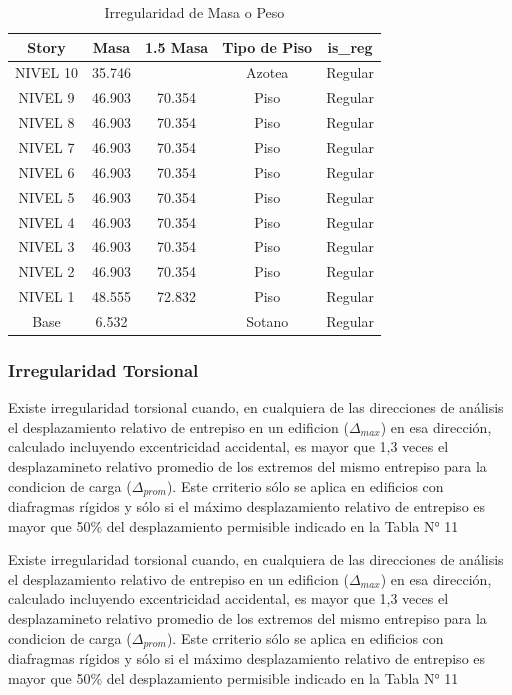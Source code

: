 \documentclass{article}%
\begin{document}
\begin{table}[H]%
\centering%
\caption{Irregularidad de Masa o Peso}%
\begin{tabular}{ccccc}
\toprule
Story & Masa & 1.5 Masa & Tipo de Piso & is\_reg \\
\midrule
NIVEL 10 & 35.746 &  & Azotea & Regular \\
NIVEL 9 & 46.903 & 70.354 & Piso & Regular \\
NIVEL 8 & 46.903 & 70.354 & Piso & Regular \\
NIVEL 7 & 46.903 & 70.354 & Piso & Regular \\
NIVEL 6 & 46.903 & 70.354 & Piso & Regular \\
NIVEL 5 & 46.903 & 70.354 & Piso & Regular \\
NIVEL 4 & 46.903 & 70.354 & Piso & Regular \\
NIVEL 3 & 46.903 & 70.354 & Piso & Regular \\
NIVEL 2 & 46.903 & 70.354 & Piso & Regular \\
NIVEL 1 & 48.555 & 72.832 & Piso & Regular \\
Base & 6.532 &  & Sotano & Regular \\
\bottomrule
\end{tabular}
%
\end{table}

%
\subsubsection{Irregularidad Torsional}%
\label{ssubsec:IrregularidadTorsional}%
\begin{tcolorbox}[colback=gray!5!white,colframe=cyan!75!black,fonttitle=\bfseries,title=Tabla N°9 E-030]%
Existe irregularidad torsional cuando, en cualquiera de las direcciones de análisis el desplazamiento relativo de entrepiso en un edificion ($\Delta_{max}$) en esa dirección, calculado incluyendo excentricidad accidental, es mayor que 1,3 veces el desplazamineto relativo promedio de los extremos del mismo entrepiso para la condicion de carga ($\Delta_{prom}$). 
 Este crriterio sólo se aplica en edificios con diafragmas rígidos y sólo si el máximo desplazamiento relativo de entrepiso es mayor que 50\% del desplazamiento permisible indicado en la Tabla N° 11%
\end{tcolorbox}%
\begin{tcolorbox}[colback=gray!5!white,colframe=cyan!75!black,fonttitle=\bfseries,title=Tabla N°9 E-030]%
Existe irregularidad torsional cuando, en cualquiera de las direcciones de análisis el desplazamiento relativo de entrepiso en un edificion ($\Delta_{max}$) en esa dirección, calculado incluyendo excentricidad accidental, es mayor que 1,3 veces el desplazamineto relativo promedio de los extremos del mismo entrepiso para la condicion de carga ($\Delta_{prom}$). 
 Este crriterio sólo se aplica en edificios con diafragmas rígidos y sólo si el máximo desplazamiento relativo de entrepiso es mayor que 50\% del desplazamiento permisible indicado en la Tabla N° 11%
\end{tcolorbox}%
\end{document}
